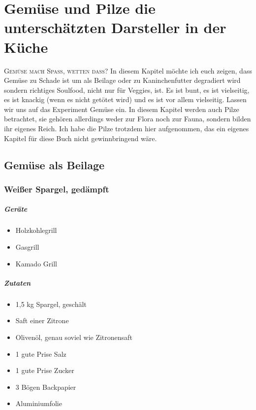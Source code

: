 \chapter{Gemüse und Pilze die unterschätzten Darsteller in der Küche}\label{Chapter3}

\lettrine[lines=3]{G}{emüse mach Spass, wetten dass?} In diesem Kapitel möchte ich euch zeigen, dass Gemüse zu Schade ist um als Beilage 
oder zu Kaninchenfutter degradiert wird sondern richtiges Soulfood, nicht nur für Veggies, ist. Es ist bunt, es ist vielseitig, es ist knackig (wenn 
es nicht getötet wird) und es ist vor allem vielseitig. Lassen wir uns auf das Experiment Gemüse ein.  In diesem Kapitel werden auch Pilze 
betrachtet, sie gehören allerdings weder zur Flora noch zur Fauna, sondern bilden ihr eigenes Reich. Ich habe die Pilze trotzdem hier 
aufgenommen, das ein eigenes Kapitel für diese Buch nicht gewinnbringend wäre.

\section{Gemüse als Beilage}

\subsection{Weißer Spargel, gedämpft}

\paragraph{Geräte}

\begin{itemize}[noitemsep]
	\item Holzkohlegrill
	\item Gasgrill
	\item Kamado Grill
\end{itemize}

\paragraph{Zutaten}

\begin{itemize}[noitemsep]
	\item 1,5 kg Spargel, geschält
	\item Saft einer Zitrone
	\item Olivenöl, genau soviel wie Zitronensaft
	\item 1 gute Prise Salz
	\item 1 gute Prise Zucker
	\item 3 Bögen Backpapier
	\item Aluminiumfolie
\end{itemize}
	
